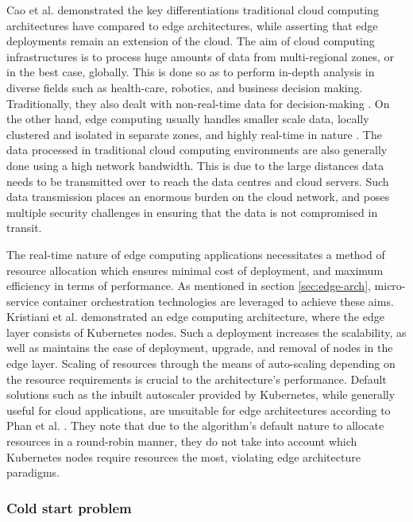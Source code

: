 Cao et al. \cite{cao2020overview} demonstrated the key differentiations traditional cloud computing architectures have compared to edge architectures, while asserting that edge deployments remain an extension of the cloud. The aim of cloud computing infrastructures is to process huge amounts of data from multi-regional zones, or in the best case, globally. This is done so as to perform in-depth analysis in diverse fields such as health-care, robotics, and business decision making. Traditionally, they also dealt with non-real-time data for decision-making \cite{premsankar2018edge}. On the other hand, edge computing usually handles smaller scale data, locally clustered and isolated in separate zones, and highly real-time in nature \cite{mishra2020early}. The data processed in traditional cloud computing environments are also generally done using a high network bandwidth. This is due to the large distances data needs to be transmitted over to reach the data centres and cloud servers. Such data transmission places an enormous burden on the cloud network, and poses multiple security challenges in ensuring that the data is not compromised in transit.\par

The real-time nature of edge computing applications necessitates a method of resource allocation which ensures minimal cost of deployment, and maximum efficiency in terms of performance. As mentioned in section \ref{sec:edge-arch}, micro-service container orchestration technologies are leveraged to achieve these aims. Kristiani et al. \cite{kristiani2019} demonstrated an edge computing architecture, where the edge layer consists of Kubernetes nodes. Such a deployment increases the scalability, as well as maintains the ease of deployment, upgrade, and removal of nodes in the edge layer. Scaling of resources through the means of auto-scaling depending on the resource requirements is crucial to the architecture's performance. Default solutions such as the inbuilt autoscaler provided by Kubernetes, while generally useful for cloud applications, are unsuitable for edge architectures according to Phan et al. \cite{phan2022traffic}. They note that due to the algorithm's default nature to allocate resources in a round-robin manner, they do not take into account which Kubernetes nodes require resources the most, violating edge architecture paradigms.

\subsubsection{Cold start problem}
\label{subsubsec:cold-start}

